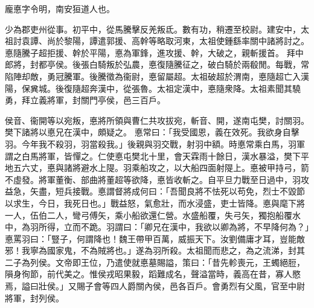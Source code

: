 \begin{pinyinscope}
 
 
 龐悳字令明，南安狟道人也。
 
 
 少為郡吏州從事。初平中，從馬騰擊反羌叛氐。數有功，稍遷至校尉。建安中，太祖討袁譚、尚於黎陽，譚遣郭援、高幹等略取河東，太祖使鍾繇率關中諸將討之。悳隨騰子超拒援、幹於平陽，悳為軍鋒，進攻援、幹，大破之，親斬援首。
 拜中郎將，封都亭侯。後張白騎叛於弘農，悳復隨騰征之，破白騎於兩殽閒。每戰，常陷陣却敵，勇冠騰軍。後騰徵為衞尉，悳留屬超。太祖破超於渭南，悳隨超亡入漢陽，保兾城。後復隨超奔漢中，從張魯。太祖定漢中，悳隨衆降。太祖素聞其驍勇，拜立義將軍，封關門亭侯，邑三百戶。
 
 
侯音、衞開等以宛叛，悳將所領與曹仁共攻拔宛，斬音、開，遂南屯樊，討關羽。樊下諸將以悳兄在漢中，頗疑之。
 悳常曰：「我受國恩，義在效死。我欲身自擊羽。今年我不殺羽，羽當殺我。」後親與羽交戰，射羽中額。時悳常乘白馬，羽軍謂之白馬將軍，皆憚之。仁使悳屯樊北十里，會天霖雨十餘日，漢水暴溢，樊下平地五六丈，悳與諸將避水上隄。羽乘船攻之，以大船四面射隄上。悳被甲持弓，箭不虛發。將軍董衡、部曲將董超等欲降，悳皆收斬之。自平旦力戰至日過中，羽攻益急，矢盡，短兵接戰。悳謂督將成何曰：「吾聞良將不怯死以苟免，烈士不毀節以求生，今日，我死日也。」戰益怒，氣愈壯，而水浸盛，吏士皆降。悳與麾下將一人，伍伯二人，彎弓傅矢，乘小船欲還仁營。水盛船覆，失弓矢，獨抱船覆水中，為羽所得，立而不跪。羽謂曰：「卿兄在漢中，我欲以卿為將，不早降何為？」悳罵羽曰：「豎子，何謂降也！魏王帶甲百萬，威振天下。汝劉備庸才耳，豈能敵邪！我寧為國家鬼，不為賊將也。」遂為羽所殺。太祖聞而悲之，為之流涕，封其二子為列侯。文帝即王位，乃遣使就悳墓賜謚，策曰：「昔先軫喪元，王蠋絕脰，隕身徇節，前代美之。惟侯戎昭果毅，蹈難成名，聲溢當時，義高在昔，寡人愍焉，謚曰壯侯。」又賜子會等四人爵關內侯，邑各百戶。會勇烈有父風，官至中尉將軍，封列侯。
 
 
\end{pinyinscope}